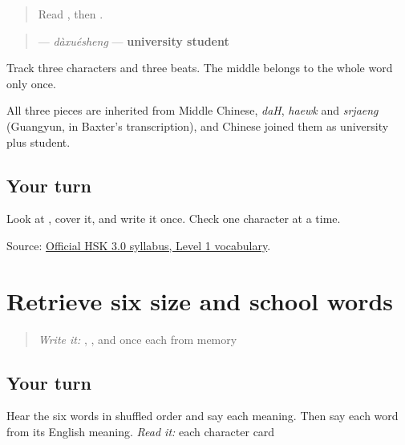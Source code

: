 \label{lesson:ZH-C13-daxuesheng}



\begin{quote}
Read \textbf{}, then \textbf{}.
\end{quote}

\begin{cousinweb}
\begin{quote}
\textbf{} — \emph{dàxuésheng} — \textbf{university student}
\end{quote}

Track three characters and three beats. The middle  belongs to the whole word only once.

All three pieces are inherited from Middle Chinese, \emph{daH}, \emph{haewk} and \emph{srjaeng} (Guangyun, in Baxter's transcription), and Chinese joined them as university plus student.
\end{cousinweb}

\subsection*{Your turn}
Look at \textbf{}, cover it, and write it once. Check one character at a time.

\begin{tcolorbox}[breakable,colback=teal!4,colframe=teal!35!black,title={Before you move on}]
Source: \href{https://hsk.cn-bj.ufileos.com/3.0/\%E6\%96\%B0\%E7\%89\%88HSK\%E8\%80\%83\%E8\%AF\%95\%E5\%A4\%A7\%E7\%BA\%B21219.pdf}{Official HSK 3.0 syllabus, Level 1 vocabulary}.
\end{tcolorbox}
\section[Practice]{Retrieve six size and school words}

\label{lesson:ZH-R13-school-six}



\begin{quote}
\emph{Write it:} , , and  once each from memory
\end{quote}

\subsection*{Your turn}
Hear the six words in shuffled order and say each meaning. Then say each word from its English meaning. \emph{Read it:} each character card

